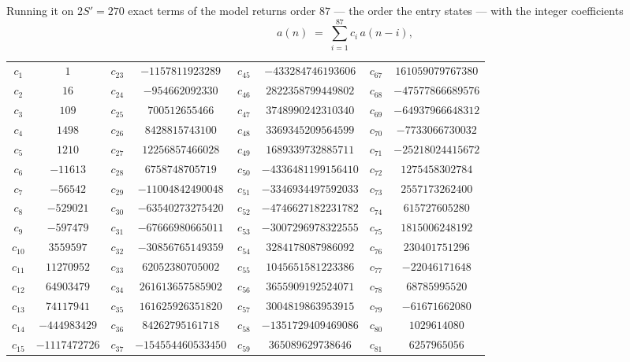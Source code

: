 \documentclass[11pt,a4paper]{article}
\theoremstyle{plain}
\theoremstyle{definition}
\begin{document}
Running it on $2S'=270$ exact terms of the model returns order $87$ --- the order the
entry states --- with the integer coefficients
\[
a(n)\;=\;\sum_{i=1}^{87}c_i\,a(n-i),
\]
\begin{center}\small
\begin{tabular}{cccccccc}
$c_{1}$ & $1$ & $c_{23}$ & $-1157811923289$ & $c_{45}$ & $-433284746193606$ & $c_{67}$ & $161059079767380$ \\
$c_{2}$ & $16$ & $c_{24}$ & $-954662092330$ & $c_{46}$ & $2822358799449802$ & $c_{68}$ & $-47577866689576$ \\
$c_{3}$ & $109$ & $c_{25}$ & $700512655466$ & $c_{47}$ & $3748990242310340$ & $c_{69}$ & $-64937966648312$ \\
$c_{4}$ & $1498$ & $c_{26}$ & $8428815743100$ & $c_{48}$ & $3369345209564599$ & $c_{70}$ & $-7733066730032$ \\
$c_{5}$ & $1210$ & $c_{27}$ & $12256857466028$ & $c_{49}$ & $1689339732885711$ & $c_{71}$ & $-25218024415672$ \\
$c_{6}$ & $-11613$ & $c_{28}$ & $6758748705719$ & $c_{50}$ & $-4336481199156410$ & $c_{72}$ & $1275458302784$ \\
$c_{7}$ & $-56542$ & $c_{29}$ & $-11004842490048$ & $c_{51}$ & $-3346934497592033$ & $c_{73}$ & $2557173262400$ \\
$c_{8}$ & $-529021$ & $c_{30}$ & $-63540273275420$ & $c_{52}$ & $-4746627182231782$ & $c_{74}$ & $615727605280$ \\
$c_{9}$ & $-597479$ & $c_{31}$ & $-67666980665011$ & $c_{53}$ & $-3007296978322555$ & $c_{75}$ & $1815006248192$ \\
$c_{10}$ & $3559597$ & $c_{32}$ & $-30856765149359$ & $c_{54}$ & $3284178087986092$ & $c_{76}$ & $230401751296$ \\
$c_{11}$ & $11270952$ & $c_{33}$ & $62052380705002$ & $c_{55}$ & $1045651581223386$ & $c_{77}$ & $-22046171648$ \\
$c_{12}$ & $64903479$ & $c_{34}$ & $261613657585902$ & $c_{56}$ & $3655909192524071$ & $c_{78}$ & $68785995520$ \\
$c_{13}$ & $74117941$ & $c_{35}$ & $161625926351820$ & $c_{57}$ & $3004819863953915$ & $c_{79}$ & $-61671662080$ \\
$c_{14}$ & $-444983429$ & $c_{36}$ & $84262795161718$ & $c_{58}$ & $-1351729409469086$ & $c_{80}$ & $1029614080$ \\
$c_{15}$ & $-1117472726$ & $c_{37}$ & $-154554460533450$ & $c_{59}$ & $365089629738646$ & $c_{81}$ & $6257965056$ \\

\end{tabular}
\end{center}
\end{document}

